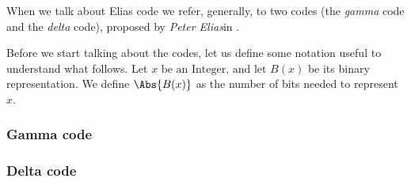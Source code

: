 \documentclass{subfiles}
\begin{document}
    When we talk about Elias code we refer, generally, 
        to two codes (the \emph{gamma} code and the \emph{delta} code),
        proposed by \emph{Peter Elias}\footnotemark[2] in \cite{Elias}.

    Before we start talking about the codes,
        let us define some notation useful to understand what follows.
        Let \(x \text{ be an Integer, and let } B(x)\) be its binary representation.
        We define \(\Abs{B(x)}\) as the number of bits needed to represent \(x\).


    \subsubsection{Gamma code}
    

    \subsubsection{Delta code}
    
\end{document}
